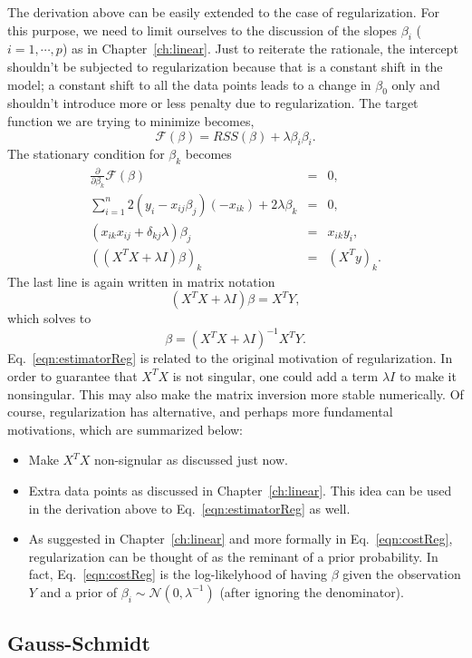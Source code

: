 The derivation above can be easily extended to the case of regularization. For this purpose, we need to limit ourselves to the discussion of the slopes $\beta_i$ ($i=1,\cdots,p$) as in Chapter~\ref{ch:linear}. Just to reiterate the rationale, the intercept shouldn't be subjected to regularization because that is a constant shift in the model; a constant shift to all the data points leads to a change in $\beta_0$ only and shouldn't introduce more or less penalty due to regularization. The target function we are trying to minimize becomes,
\begin{equation}
	\mathcal F(\beta)=RSS(\beta)+\lambda\beta_i\beta_i.\label{eqn:costReg}
\end{equation}
The stationary condition for $\beta_k$ becomes
\begin{eqnarray}
	\frac{\partial}{\partial\beta_k}\mathcal F(\beta) &=& 0, \\
	\sum_{i=1}^{n}2\left(y_i-x_{ij}\beta_j\right)(-x_{ik}) + 2\lambda\beta_k & = & 0,\\
	(x_{ik}x_{ij}+\delta_{kj}\lambda)\beta_j &=& x_{ik}y_i, \\
	((X^TX+\lambda I)\beta)_k &=& (X^Ty)_k.
\end{eqnarray} 
The last line is again written in matrix notation
\begin{equation}
	(X^TX+\lambda I)\beta = X^TY,
\end{equation}
which solves to
\begin{equation}
	\beta = (X^TX+\lambda I)^{-1}X^TY.\label{eqn:estimatorReg}
\end{equation}
Eq.~\ref{eqn:estimatorReg} is related to the original motivation of regularization. In order to guarantee that $X^TX$ is not singular, one could add a term $\lambda I$ to make it nonsingular. This may also make the matrix inversion more stable numerically. Of course, regularization has alternative, and perhaps more fundamental motivations, which are summarized below:
\begin{itemize}
	\item Make $X^TX$ non-signular as discussed just now.
	\item Extra data points as discussed in Chapter~\ref{ch:linear}. This idea can be used in the derivation above to Eq.~\ref{eqn:estimatorReg} as well.
	\item As suggested in Chapter~\ref{ch:linear} and more formally in Eq.~\ref{eqn:costReg}, regularization can be thought of as the reminant of a prior probability. In fact, Eq.~\ref{eqn:costReg} is the log-likelyhood of having $\beta$ given the observation $Y$ and a prior of $\beta_i\sim\mathcal N(0,\lambda^{-1})$ (after ignoring the denominator).
\end{itemize}
\subsection{Gauss-Schmidt}


